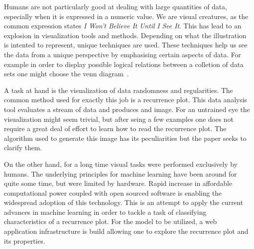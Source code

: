 Humans are not particularly good at dealing with large quantities of data, especially when it is expressed in a numeric value.
We are visual creatures, as the common expression states \emph{I Won’t Believe It Until I See It}.
This has lead to an explosion in visualization tools and methods.
Depending on what the illustration is intented to represent, unique techniques are used.
These techniques help us see the data from a unique perspective by emphasising certain aspects of data.
For example in order to display possible logical relations between a colletion of data sets one might choose the venn diagram~\cite{venn-diagram}.

A task at hand is the visualization of data randomness and regularities.
The common method used for exactly this job is a recurrence plot.
This data analysis tool evaluates a stream of data and produces and image.
For an untrained eye the visualization might seem trivial, but after seing a few examples one does not require a great deal of effort to learn how to read the recurrence plot.
The algorithm used to generate this image has its peculiarities but the paper seeks to clarify them.

On the other hand, for a long time visual tasks were performed exclusively by humans.
The underlying principles for machine learning have been around for quite some time, but were limited by hardware.
Rapid increase in affordable computational power coupled with open sourced software is enabling the widespread adoption of this technology.
This is an attempt to apply the current advances in machine learning in order to tackle a task of classifying characteristics of a recurrence plot.
For the model to be utilized, a web application infrastructure is build allowing one to explore the recurrence plot and its properties.